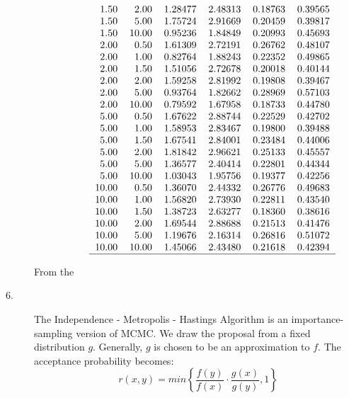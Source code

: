 \documentclass[12pt]{article}
\begin{document}
\begin{description}
\begin{description}
\[\begin{tabular}{rrrrrr}
  1.50 & 2.00 & 1.28477 & 2.48313 & 0.18763 & 0.39565 \\ 
  1.50 & 5.00 & 1.75724 & 2.91669 & 0.20459 & 0.39817 \\ 
  1.50 & 10.00 & 0.95236 & 1.84849 & 0.20993 & 0.45693 \\ 
  2.00 & 0.50 & 1.61309 & 2.72191 & 0.26762 & 0.48107 \\ 
  2.00 & 1.00 & 0.82764 & 1.88243 & 0.22352 & 0.49865 \\ 
  2.00 & 1.50 & 1.51056 & 2.72678 & 0.20018 & 0.40144 \\ 
  2.00 & 2.00 & 1.59258 & 2.81992 & 0.19808 & 0.39467 \\ 
  2.00 & 5.00 & 0.93764 & 1.82662 & 0.28969 & 0.57103 \\ 
  2.00 & 10.00 & 0.79592 & 1.67958 & 0.18733 & 0.44780 \\ 
  5.00 & 0.50 & 1.67622 & 2.88744 & 0.22529 & 0.42702 \\ 
  5.00 & 1.00 & 1.58953 & 2.83467 & 0.19800 & 0.39488 \\ 
  5.00 & 1.50 & 1.67541 & 2.84001 & 0.23484 & 0.44006 \\ 
  5.00 & 2.00 & 1.81842 & 2.96621 & 0.25133 & 0.45557 \\ 
  5.00 & 5.00 & 1.36577 & 2.40414 & 0.22801 & 0.44344 \\ 
  5.00 & 10.00 & 1.03043 & 1.95756 & 0.19377 & 0.42256 \\ 
  10.00 & 0.50 & 1.36070 & 2.44332 & 0.26776 & 0.49683 \\ 
  10.00 & 1.00 & 1.56820 & 2.73930 & 0.22811 & 0.43540 \\ 
  10.00 & 1.50 & 1.38723 & 2.63277 & 0.18360 & 0.38616 \\ 
  10.00 & 2.00 & 1.69544 & 2.88688 & 0.21513 & 0.41476 \\ 
  10.00 & 5.00 & 1.19676 & 2.16314 & 0.26816 & 0.51072 \\ 
  10.00 & 10.00 & 1.45066 & 2.43480 & 0.21618 & 0.42394 \\ 
   \hline
\end{tabular}\]
\end{description}

From the 


\item[6. ] The Independence - Metropolis - Hastings Algorithm is an importance-sampling version of MCMC. We draw the proposal from a fixed distribution $g$. Generally, $g$ is chosen to be an approximation to $f$. The acceptance probability becomes:
\[r(x, y) = min\left\{ \frac{f(y)}{f(x)} \cdot \frac{g(x)}{g(y)}, 1 \right\}\]


\end{description}
\end{document}
